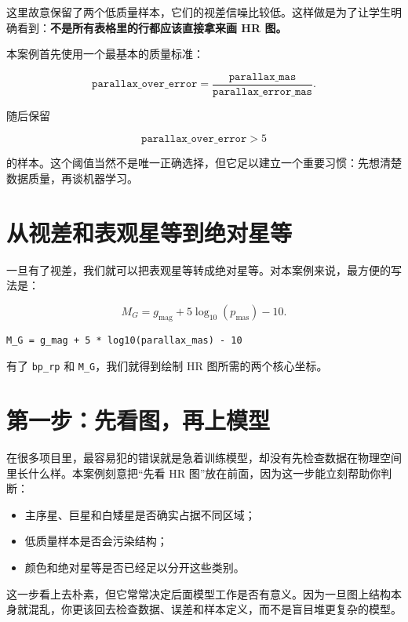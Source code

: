 这里故意保留了两个低质量样本，它们的视差信噪比较低。这样做是为了让学生明确看到：\textbf{不是所有表格里的行都应该直接拿来画 HR 图。}

本案例首先使用一个最基本的质量标准：

\[
\texttt{parallax\_over\_error}
=
\frac{\texttt{parallax\_mas}}
{\texttt{parallax\_error\_mas}}.
\]

随后保留

\[
\texttt{parallax\_over\_error} > 5
\]

的样本。这个阈值当然不是唯一正确选择，但它足以建立一个重要习惯：先想清楚数据质量，再谈机器学习。

\section{从视差和表观星等到绝对星等}

一旦有了视差，我们就可以把表观星等转成绝对星等。对本案例来说，最方便的写法是：

\[
M_G = g_{\mathrm{mag}} + 5\log_{10}(p_{\mathrm{mas}}) - 10.
\]

\begin{examplebox}[绝对星等公式]
\begin{lstlisting}[style=pythonstyle]
M_G = g_mag + 5 * log10(parallax_mas) - 10
\end{lstlisting}
\end{examplebox}

有了 \texttt{bp\_rp} 和 \texttt{M\_G}，我们就得到绘制 HR 图所需的两个核心坐标。

\section{第一步：先看图，再上模型}

在很多项目里，最容易犯的错误就是急着训练模型，却没有先检查数据在物理空间里长什么样。本案例刻意把“先看 HR 图”放在前面，因为这一步能立刻帮助你判断：

\begin{itemize}
    \item 主序星、巨星和白矮星是否确实占据不同区域；
    \item 低质量样本是否会污染结构；
    \item 颜色和绝对星等是否已经足以分开这些类别。
\end{itemize}

这一步看上去朴素，但它常常决定后面模型工作是否有意义。因为一旦图上结构本身就混乱，你更该回去检查数据、误差和样本定义，而不是盲目堆更复杂的模型。

